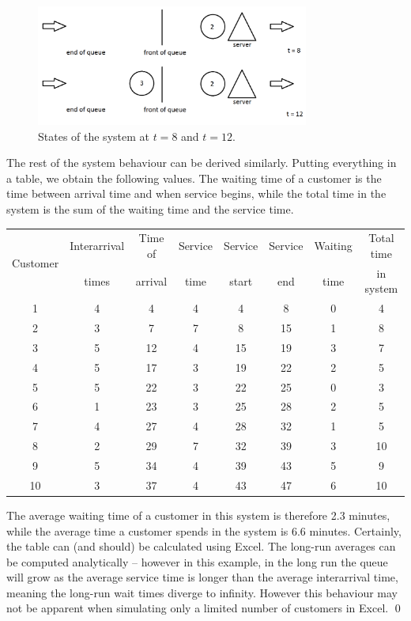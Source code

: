 \begin{myexample}
\begin{figure}[htbp]
	\centering
	\includegraphics[width=0.8\textwidth]{fig/4_queue_ex1c.png}
	\caption{States of the system at $t = 8$ and $t = 12$. \label{fig:4_queue_ex1c}}
\end{figure}

The rest of the system behaviour can be derived similarly.
Putting everything in a table, we obtain the following values.
The waiting time of a customer is the time between arrival time and when service begins, while the total time in the system is the sum of the waiting time and the service time.

{\small
\begin{center}
\begin{tabular}{cccccccc}
	\multirow{2}{*}{Customer} & Interarrival & Time of & Service & Service & Service & Waiting & Total time \\
	& times & arrival & time & start & end & time & in system \\
\hline
1 & 4 & 4 & 4 & 4 & 8 & 0 & 4 \\
2 & 3 & 7 & 7 & 8 & 15 & 1 & 8 \\
3 & 5 & 12 & 4 & 15 & 19 & 3 & 7 \\
4 & 5 & 17 & 3 & 19 & 22 & 2 & 5 \\
5 & 5 & 22 & 3 & 22 & 25 & 0 & 3 \\
6 & 1 & 23 & 3 & 25 & 28 & 2 & 5 \\
7 & 4 & 27 & 4 & 28 & 32 & 1 & 5 \\
8 & 2 & 29 & 7 & 32 & 39 & 3 & 10 \\
9 & 5 & 34 & 4 & 39 & 43 & 5 & 9 \\
10 & 3 & 37 & 4 & 43 & 47 & 6 & 10
\end{tabular}
\end{center}
}

The average waiting time of a customer in this system is therefore 2.3 minutes, while the average time a customer spends in the system is 6.6 minutes.
Certainly, the table can (and should) be calculated using Excel.
The long-run averages can be computed analytically -- however in this example, in the long run the queue will grow as the average service time is longer than the average interarrival time, meaning the long-run wait times diverge to infinity.
However this behaviour may not be apparent when simulating only a limited number of customers in Excel. \qed


\end{myexample}

